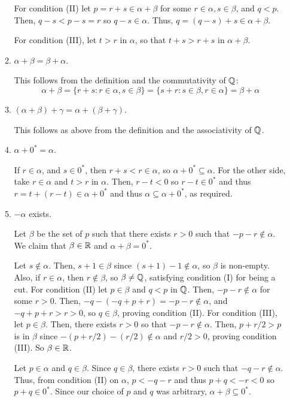 \begin{enumerate}[Step 1.]
\begin{enumerate}[({A}1)]
For condition (II) let $p = r + s \in \alpha + \beta$ for some $r \in \alpha, s \in \beta$, and $q < p$. Then, $q - s < p - s = r$ so $q - s \in \alpha$. Thus, $q = (q - s) + s \in \alpha + \beta$. 

For condition (III), let $t > r$ in $\alpha$, so that $t + s > r + s$ in $\alpha + \beta$. 

\item $\alpha + \beta = \beta + \alpha$.

This follows from the definition and the commutativity of $\mathbb{Q}$:
\[
	\alpha + \beta = \{r + s : r \in \alpha, s \in \beta\} = \{s + r : s \in \beta, r \in \alpha\} = \beta + \alpha
\]

\item $(\alpha + \beta) + \gamma = \alpha + (\beta + \gamma)$. 

This follows as above from the definition and the associativity of $\mathbb{Q}$.

\item $\alpha + 0^* = \alpha$.

If $r \in \alpha$, and $s \in 0^*$, then $r + s < r \in \alpha$, so $\alpha + 0^* \subseteq \alpha$. For the other side, take $r \in \alpha$ and $t > r$ in $\alpha$. Then, $r - t < 0$ so $r - t \in 0^*$ and thus $r = t + (r - t) \in \alpha + 0^*$ and thus $\alpha \subseteq \alpha + 0^*$, as required.

\item $-\alpha$ exists.

Let $\beta$ be the set of $p$ such that there exists $r > 0$ such that $-p - r \not\in \alpha$. We claim that $\beta \in \mathbb{R}$ and $\alpha + \beta = 0^*$.

Let $s \not \in \alpha$. Then, $s + 1 \in \beta$ since $(s + 1) - 1 \not\in \alpha$, so $\beta$ is non-empty. Also, if $r \in \alpha$, then $r \not \in \beta$, so $\beta \ne \mathbb{Q}$, satisfying condition (I) for being a cut. For condition (II) let $p \in \beta$ and $q < p$ in $\mathbb{Q}$. Then, $-p - r \not\in \alpha$ for some $r > 0$. Then, $-q - (-q + p + r) = -p - r \not\in \alpha$, and $-q + p + r > r > 0$, so $q \in \beta$, proving condition (II). For condition (III), let $p \in \beta$. Then, there exists $r > 0$ so that $-p - r \not\in \alpha$. Then, $p + r/2 > p$ is in $\beta$ since $-(p + r/2) - (r/2) \not\in \alpha$ and $r/2 > 0$, proving condition (III). So $\beta \in \mathbb{R}$.

Let $p \in \alpha$ and $q \in \beta$. Since $q \in \beta$, there exists $r > 0$ such that $-q - r \not\in \alpha$. Thus, from condition (II) on $\alpha$, $p < -q - r$ and thus $p + q < -r < 0$ so $p + q \in 0^*$. Since our choice of $p$ and $q$ was arbitrary, $\alpha + \beta \subseteq 0^*$. 


\end{enumerate}
\end{enumerate}
